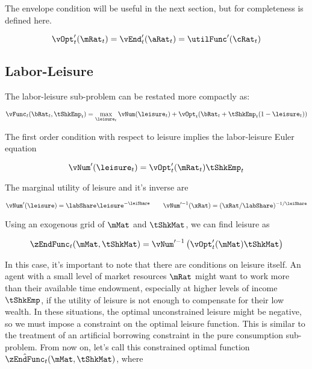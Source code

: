 \documentclass[\econtexRoot/SequentialEGM]{subfiles}
\begin{document}
The envelope condition will be useful in the next section, but for completeness
is defined here.

\begin{equation}
        \vOpt_{t}'(\mRat_{t}) = \vEnd_{t}'(\aRat_{t}) = \utilFunc'(\cRat_{t})
\end{equation}

\subsection{Labor-Leisure}

The labor-leisure sub-problem can  be restated more compactly as:

\begin{equation}
        \vFunc_{t}(\bRat_{t}, \tShkEmp_{t}) = \max_{ \leisure_{t}}
        \vNum(\leisure_{t}) + \vOpt_{t}(\bRat_{t} +
        \tShkEmp_{t}(1-\leisure_{t}))
\end{equation}

The first order condition with respect to leisure implies the labor-leisure Euler equation

\begin{equation}
        \vNum'(\leisure_{t}) =	\vOpt_{t}'(\mRat_{t}) \tShkEmp_{t}
\end{equation}

The marginal utility of leisure and it's inverse are

\begin{equation}
        \vNum'(\leisure) = \labShare\leisure^{-\leiShare} \qquad
        \vNum'^{-1}(\xRat) = (\xRat/\labShare)^{-1/\leiShare}
\end{equation}

Using an exogenous grid of $\mMat$ and $\tShkMat$, we can find leisure as

\begin{equation}
        \zEndFunc_{t}(\mMat, \tShkMat) = \vNum'^{-1}\left(
        \vOpt_{t}'(\mMat) \tShkMat \right)
\end{equation}

In this case, it's important to note that there are conditions on leisure itself. An agent with a small level of market resources $\mRat$ might want to work more than their available time endowment, especially at higher levels of income $\tShkEmp$, if the utility of leisure is not enough to compensate for their low wealth. In these situations, the optimal unconstrained leisure might be negative, so we must impose a constraint on the optimal leisure function. This is similar to the treatment of an artificial borrowing constraint in the pure consumption sub-problem. From now on, let's call this constrained optimal function $\hat{\zEndFunc}_{t}(\mMat, \tShkMat)$, where
\end{document}

